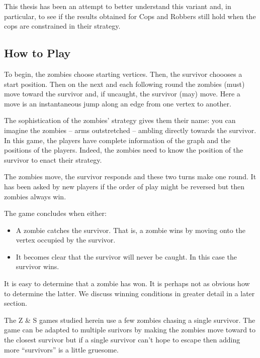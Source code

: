 This thesis has been an attempt to better understand this variant and, in particular,
to see if the results obtained for Cops and Robbers still hold when the cops
are constrained in their strategy.

\subsection{How to Play}

To begin, the zombies choose starting vertices.
Then, the survivor choooses a start position.
Then on the next and each following round the zombies (must) move toward the survivor
and, if uncaught, the survivor (may) move. Here a move is an instantaneous jump
along an edge from one vertex to another.

The sophistication of the zombies' strategy gives them their name:
you can imagine the zombies -- arms outstretched -- ambling directly towards the survivor.
In this game, the players have complete information of the graph and the positions of the players. Indeed, the zombies need to know the position of the survivor to enact
their strategy.

The zombies move, the survivor responds and these two turns make one round.
It has been asked by new players if the order of play might be reversed but
then zombies always win.

The game concludes when either:
\begin{itemize}
\item A zombie catches the survivor. That is, a zombie wins by moving onto the vertex
occupied by the survivor.
\item It becomes clear that the survivor will never be caught.
In this case the survivor wins.
\end{itemize}

It is easy to determine that a zombie has won. It is perhaps not as obvious how
to determine the latter. We discuss winning conditions in greater detail in a later section.

The Z \& S games studied herein use a few zombies chasing a single survivor. The game
can be adapted to multiple surivors by making the zombies move toward
to the closest survivor but if a single survivor can't hope to escape then adding more ``survivors''
is a little gruesome.
